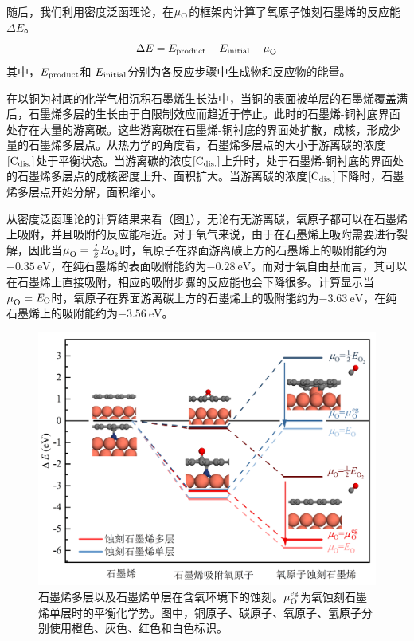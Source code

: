 随后，我们利用密度泛函理论，在$\mu_{\rm O}^{\rm } \it$的框架内计算了氧原子蚀刻石墨烯的反应能$\Delta E$。
\begin{equation}
    \Delta E = E_{\rm product} - E_{\rm initial} - \mu_{\rm O}^{\rm } \it
\end{equation}
其中，$E_{\rm product}$和 $E_{\rm initial}$分别为各反应步骤中生成物和反应物的能量。

在以铜为衬底的化学气相沉积石墨烯生长法中，当铜的表面被单层的石墨烯覆盖满后，石墨烯多层的生长由于自限制效应而趋近于停止。此时的石墨烯-铜衬底界面处存在大量的游离碳。这些游离碳在石墨烯-铜衬底的界面处扩散，成核，形成少量的石墨烯多层点。从热力学的角度看，石墨烯多层点的大小于游离碳的浓度$\rm{\left[C_{dis.}\right]} \it$处于平衡状态。当游离碳的浓度$\rm{\left[C_{dis.}\right]} \it$上升时，处于石墨烯-铜衬底的界面处的石墨烯多层点的成核密度上升、面积扩大。当游离碳的浓度$\rm{\left[C_{dis.}\right]} \it$下降时，石墨烯多层点开始分解，面积缩小。

从密度泛函理论的计算结果来看（图\ref{fig:FLG_DFT_Oetch}），无论有无游离碳，氧原子都可以在石墨烯上吸附，并且吸附的反应能相近。对于氧气来说，由于在石墨烯上吸附需要进行裂解，因此当$\muO{}=\halfEOm$时，氧原子在界面游离碳上方的石墨烯上的吸附能约为$\SI{-0.35}{\electronvolt}$，在纯石墨烯的表面吸附能约为$\SI{-0.28}{\electronvolt}$。而对于氧自由基而言，其可以在石墨烯上直接吸附，相应的吸附步骤的反应能也会下降很多。计算显示当$\mu_{\rm O}^{\rm } \it=\it E_{\rm O} \it$时，氧原子在界面游离碳上方的石墨烯上的吸附能约为$\SI{-3.63}{\electronvolt}$，在纯石墨烯上的吸附能约为$\SI{-3.56}{\electronvolt}$。

\begin{figure}[htb]
    \includegraphics{pic/FLG_DFT_Oetch.png}
    \caption{
        石墨烯多层以及石墨烯单层在含氧环境下的蚀刻。$\mu_{\rm O}^{\rm eg} \it$为氧蚀刻石墨烯单层时的平衡化学势。图中，铜原子、碳原子、氧原子、氢原子分别使用橙色、灰色、红色和白色标识。
    }
    \label{fig:FLG_DFT_Oetch}
\end{figure}

